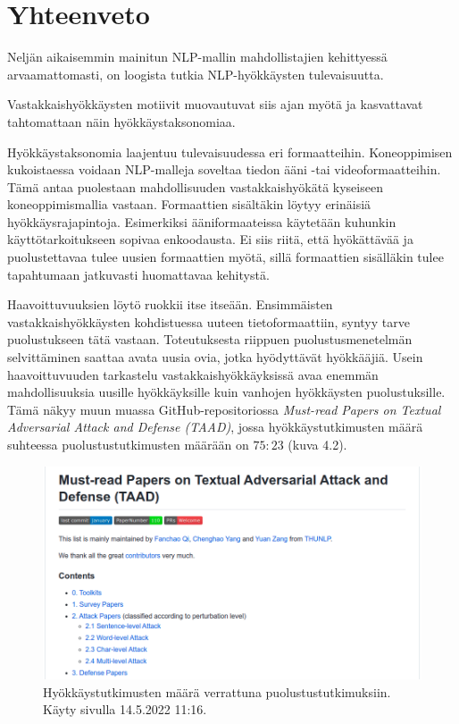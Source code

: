 \chapter{Yhteenveto\label{conclusions}}

Neljän aikaisemmin mainitun NLP-mallin mahdollistajien kehittyessä arvaamattomasti, on loogista tutkia NLP-hyökkäysten tulevaisuutta. 

Vastakkaishyökkäysten motiivit muovautuvat siis ajan myötä ja kasvattavat tahtomattaan näin hyökkäystaksonomiaa. 

Hyökkäystaksonomia laajentuu tulevaisuudessa eri formaatteihin. Koneoppimisen kukoistaessa voidaan NLP-malleja soveltaa tiedon ääni -tai videoformaatteihin. Tämä antaa puolestaan mahdollisuuden vastakkaishyökätä kyseiseen koneoppimismallia vastaan. Formaattien sisältäkin löytyy erinäisiä hyökkäysrajapintoja. Esimerkiksi ääniformaateissa käytetään kuhunkin käyttötarkoitukseen sopivaa enkoodausta. Ei siis riitä, että hyökättävää ja puolustettavaa tulee uusien formaattien myötä, sillä formaattien sisälläkin tulee tapahtumaan jatkuvasti huomattavaa kehitystä.

Haavoittuvuuksien löytö ruokkii itse itseään. Ensimmäisten vastakkaishyökkäysten kohdistuessa uuteen tietoformaattiin, syntyy tarve puolustukseen tätä vastaan. Toteutuksesta riippuen puolustusmenetelmän selvittäminen saattaa avata uusia ovia, jotka hyödyttävät hyökkääjiä. Usein haavoittuvuuden tarkastelu vastakkaishyökkäyksissä avaa enemmän mahdollisuuksia uusille hyökkäyksille kuin vanhojen hyökkäysten puolustuksille. Tämä näkyy muun muassa GitHub-repositoriossa \textit{Must-read Papers on Textual Adversarial Attack and Defense (TAAD)}, jossa hyökkäystutkimusten määrä suhteessa puolustustutkimusten määrään on $75:23$ (kuva 4.2).

\begin{figure}[ht]
  \includegraphics[scale=0.4]{figures/github-papers.png}
  \caption{Hyökkäystutkimusten määrä verrattuna puolustustutkimuksiin. Käyty sivulla 14.5.2022 11:16.}
\end{figure}

